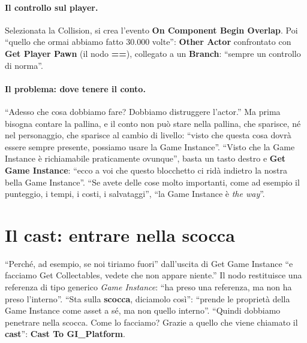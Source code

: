 \paragraph{Il controllo sul player.} Selezionata la Collision, si crea l'evento
\textbf{On Component Begin Overlap}. Poi ``quello che ormai abbiamo fatto 30.000 volte'':
\textbf{Other Actor} confrontato con \textbf{Get Player Pawn} (il nodo \textbf{==}),
collegato a un \textbf{Branch}: ``sempre un controllo di norma''.

\paragraph{Il problema: dove tenere il conto.} ``Adesso che cosa dobbiamo fare? Dobbiamo
distruggere l'actor.'' Ma prima bisogna contare la pallina, e il conto non può stare
nella pallina, che sparisce, né nel personaggio, che sparisce al cambio di livello: ``visto
che questa cosa dovrà essere sempre presente, possiamo usare la Game Instance''. ``Visto
che la Game Instance è richiamabile praticamente ovunque'', basta un tasto destro e
\textbf{Get Game Instance}: ``ecco a voi che questo blocchetto ci ridà indietro la nostra
bella Game Instance''. ``Se avete delle cose molto importanti, come ad esempio il
punteggio, i tempi, i costi, i salvataggi'', ``la Game Instance è \emph{the way}''.

\section{Il cast: entrare nella scocca}
\label{ue8:sec:cast}

``Perché, ad esempio, se noi tiriamo fuori'' dall'uscita di Get Game Instance ``e
facciamo Get Collectables, vedete che non appare niente.'' Il nodo restituisce una
referenza di tipo generico \emph{Game Instance}: ``ha preso una referenza, ma non ha
preso l'interno''. ``Sta sulla \textbf{scocca}, diciamolo così'': ``prende le proprietà
della Game Instance come asset a sé, ma non quello interno''. ``Quindi dobbiamo penetrare
nella scocca. Come lo facciamo? Grazie a quello che viene chiamato il \textbf{cast}'':
\textbf{Cast To GI\_Platform}.

